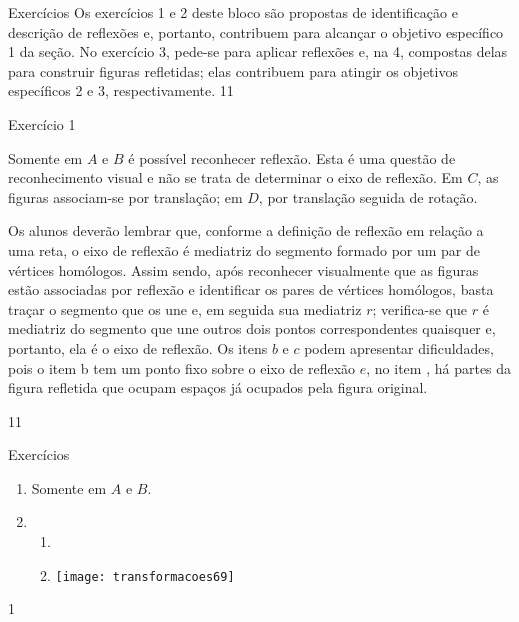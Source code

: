\clearpage
\def\currentcolor{cor1}
\begin{objectives}{Exercícios}
{
Os exercícios 1 e 2 deste bloco são propostas de identificação e descrição de reflexões e, portanto, contribuem para alcançar o objetivo específico 1 da seção. No exercício 3, pede-se para aplicar reflexões e, na 4, compostas delas para construir figuras refletidas; elas contribuem para atingir os objetivos específicos 2 e 3, respectivamente.   
}{1}{1}
\end{objectives}
\begin{sugestions}{Exercício 1}
{
Somente em $A$ e $B$ é possível reconhecer reflexão. Esta é uma questão de reconhecimento visual e não se trata de determinar o eixo de reflexão. Em $C$, as figuras associam-se por translação; em $D$, por translação seguida de rotação. 


Os alunos deverão lembrar que, conforme a definição de reflexão em relação a uma reta, o eixo de reflexão é mediatriz do segmento formado por um par de vértices homólogos. Assim sendo, após reconhecer visualmente que as figuras estão associadas por reflexão e identificar os pares de vértices homólogos,  basta traçar o segmento que os une e, em seguida sua mediatriz $r$; verifica-se que $r$ é mediatriz do segmento que une outros dois pontos correspondentes quaisquer e, portanto, ela é o eixo de reflexão. Os itens $b$ e $c$ podem apresentar dificuldades, pois o item b tem um ponto fixo sobre o eixo de reflexão $e$, no item , há partes da figura refletida que ocupam espaços já ocupados pela figura original.
}{1}{1}
\end{sugestions}
\begin{answer}{Exercícios}
{\exerciselist
\begin{enumerate}
\item Somente em $A$ e $B$.
\item 
\begin{enumerate}

\item\item[] 
{
\texttt{[image: transformacoes69]}
}
\end{enumerate}
\end{enumerate}
}{1}
\end{answer}


